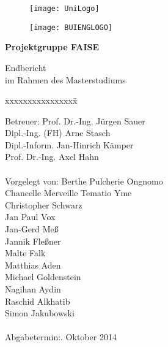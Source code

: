 \begin{titlepage}
  \begin{centering}
  \begin{figure}[h!]
    \centering
    \texttt{[image: UniLogo]}
  \end{figure}

  \vspace*{-0.8cm}

  \begin{figure}[h!]
    \centering
    \texttt{[image: BUIENGLOGO]}
  \end{figure}

  \vspace*{0.4cm}
  
  \textsf{\Huge \textbf{Projektgruppe FAISE\\}}

  \vspace*{0.5cm}
  \noindent Endbericht\\
  im Rahmen des Masterstudiums

  \end{centering}
  
  \vspace*{1.5cm}
  \begin{tabbing}
  xxxxxxxxxxxxxxxx\= \kill
  
  \small Betreuer: \>Prof. Dr.-Ing. Jürgen Sauer\\
  \small \>Dipl.-Ing. (FH) Arne Stasch\\
  \small \>Dipl.-Inform. Jan-Hinrich Kämper\\
  \small \>Prof. Dr.-Ing. Axel Hahn\\\\

  \small Vorgelegt von: \>Berthe Pulcherie Ongnomo\\
  \small \>Chancelle Merveille Tematio Yme\\
  \small \>Christopher Schwarz\\
  \small \>Jan Paul Vox\\
  \small \>Jan-Gerd Meß\\
  \small \>Jannik Fleßner\\
  \small \>Malte Falk\\
  \small \>Matthias Aden\\
  \small \>Michael Goldenstein\\
  \small \>Nagihan Aydin\\
  \small \>Raschid Alkhatib\\
  \small \>Simon Jakubowski\\\\

  \small Abgabetermin:. Oktober 2014
  \end{tabbing}
\end{titlepage}